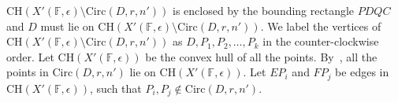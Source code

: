 
    



$\mathrm{CH}(X'(\mathbb{F},\epsilon)\setminus \mathrm{Circ}(D,r,n'))$ is enclosed by the bounding rectangle $PDQC$ and $D$ must lie on $\mathrm{CH}(X'(\mathbb{F},\epsilon)\setminus \mathrm{Circ}(D,r,n'))$. We label the vertices of $\mathrm{CH}(X'(\mathbb{F},\epsilon)\setminus \mathrm{Circ}(D,r,n'))$ as $D,P_1,P_2,\ldots,P_k$ in the counter-clockwise order. Let $\mathrm{CH}(X'(\mathbb{F},\epsilon))$ be the convex hull of all the points. By~, all the points in $\mathrm{Circ}(D,r,n')$ lie on $\mathrm{CH}(X'(\mathbb{F},\epsilon))$. Let $EP_i$ and $FP_j$ be edges in $\mathrm{CH}(X'(\mathbb{F},\epsilon))$, such that $P_i,P_j \notin \mathrm{Circ}(D,r,n')$.

